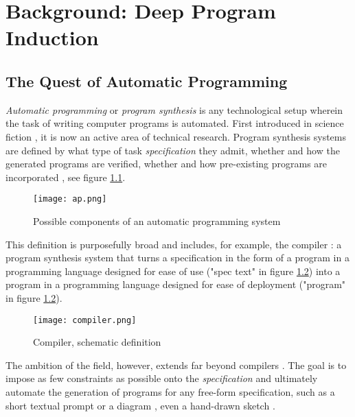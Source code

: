 \chapter{Background: Deep Program Induction} 
\label{ch:promise}

\section{The Quest of Automatic Programming}

\label{sec:quest}

\emph{Automatic programming} or \emph{program synthesis} is any technological setup wherein the task of writing computer programs is automated. 
First introduced in science fiction \cite{jenkinsLogicNamedJoe1946}, it is now an active area of technical research.
Program synthesis systems are defined by what type of task \emph{specification} they admit, whether and how the generated programs are verified, whether and how pre-existing programs are incorporated \cite{gulwaniDimensionsProgramSynthesis2010}, see figure \ref{fig:ap}.

\begin{figure}
    \centering
    \texttt{[image: ap.png]}
    \caption{Possible components of an automatic programming system}
    \label{fig:ap}
\end{figure}

This definition is purposefully broad and includes, for example, the compiler \cite{penjamDeductiveInductiveMethods2003,patrickmckenzie[@patio11]GlibLineHave2023}: a program synthesis system that turns a specification in the form of a program in a programming language designed for ease of use ("spec text" in figure \ref{fig:compiler}) into a program in a programming language designed for ease of deployment ("program" in figure \ref{fig:compiler}).

\begin{figure}
    \centering
    \texttt{[image: compiler.png]}
    \caption{Compiler, schematic definition}
    \label{fig:compiler}
\end{figure}

The ambition of the field, however, extends far beyond compilers \cite{campbellAutomatedCodingQuest2020}.
The goal is to impose as few constraints as possible onto the \emph{specification} and ultimately automate the generation of programs for any free-form specification, such as a short textual \cite{zanLargeLanguageModels2023} prompt or a diagram \cite{koziolekLLMbasedControlCode2023}, even a hand-drawn sketch \cite{chatgptmodderChatgptCanNow2023}.

